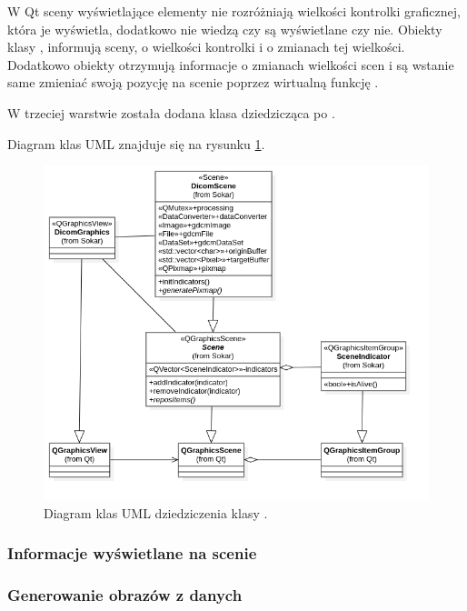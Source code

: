 W Qt sceny wyświetlające elementy nie rozróżniają wielkości kontrolki graficznej, która je wyświetla, dodatkowo nie wiedzą czy są wyświetlane czy nie.
Obiekty klasy , informują sceny, o wielkości kontrolki i o zmianach tej wielkości.
Dodatkowo obiekty  otrzymują informacje o zmianach wielkości scen i są wstanie same zmieniać swoją pozycję na scenie poprzez wirtualną funkcję .
\par
W trzeciej warstwie została dodana klasa  dziedzicząca po .
\par
Diagram klas UML znajduje się na rysunku \ref{uml:sokar-scene-layers}.

\begin{figure}[!htbp]
    \centering
    \includegraphics[width=\textwidth]{img/uml/dicom-scene-layers.png}
    \caption{Diagram klas UML dziedziczenia klasy .}
    \label{uml:sokar-scene-layers}
\end{figure}


\subsubsection{Informacje wyświetlane na scenie}


\subsubsection{Generowanie obrazów z danych}

